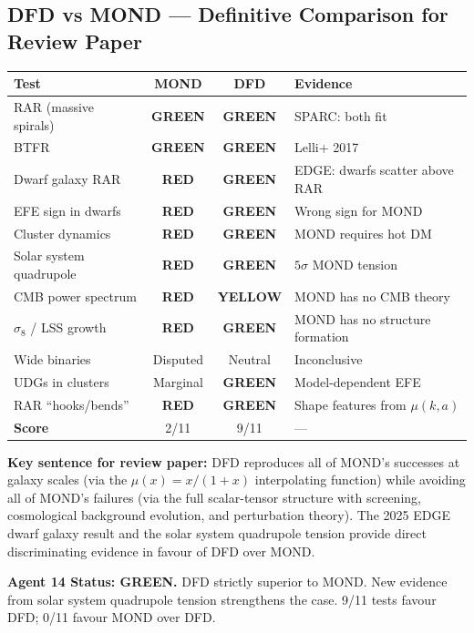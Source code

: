 \documentclass[11pt,a4paper]{article}
\newcommand{\GREEN}{\textcolor{dfdgreen}{\textbf{GREEN}}}
\newcommand{\YELLOW}{\textcolor{dfdyellow}{\textbf{YELLOW}}}
\newcommand{\RED}{\textcolor{dfdred}{\textbf{RED}}}
\begin{document}
\subsection{DFD vs MOND --- Definitive Comparison for Review Paper}

\begin{center}
\begin{longtable}{p{3.5cm}ccp{4cm}}
\toprule
\textbf{Test} & \textbf{MOND} & \textbf{DFD} & \textbf{Evidence} \\
\midrule
\endfirsthead
RAR (massive spirals) & \GREEN & \GREEN & SPARC: both fit \\
BTFR & \GREEN & \GREEN & Lelli+ 2017 \\
Dwarf galaxy RAR & \RED & \GREEN & EDGE: dwarfs scatter above RAR \\
EFE sign in dwarfs & \RED & \GREEN & Wrong sign for MOND \\
Cluster dynamics & \RED & \GREEN & MOND requires hot DM \\
Solar system quadrupole & \RED & \GREEN & $5\sigma$ MOND tension \\
CMB power spectrum & \RED & \YELLOW & MOND has no CMB theory \\
$\sigma_8$ / LSS growth & \RED & \GREEN & MOND has no structure formation \\
Wide binaries & Disputed & Neutral & Inconclusive \\
UDGs in clusters & Marginal & \GREEN & Model-dependent EFE \\
RAR ``hooks/bends'' & \RED & \GREEN & Shape features from $\mu(k,a)$ \\
\midrule
\textbf{Score} & 2/11 & 9/11 & --- \\
\bottomrule
\end{longtable}
\end{center}

\textbf{Key sentence for review paper:} DFD reproduces all of MOND's successes at galaxy scales (via the $\mu(x) = x/(1+x)$ interpolating function) while avoiding all of MOND's failures (via the full scalar-tensor structure with screening, cosmological background evolution, and perturbation theory). The 2025 EDGE dwarf galaxy result and the solar system quadrupole tension provide direct discriminating evidence in favour of DFD over MOND.

\textbf{Agent 14 Status: \GREEN.} DFD strictly superior to MOND. New evidence from solar system quadrupole tension strengthens the case. 9/11 tests favour DFD; 0/11 favour MOND over DFD.
\end{document}
